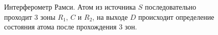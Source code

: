 \begin{figure}
\centering



\caption{Интерферометр Рамси. Атом из источника $S$ последовательно
  проходит 3 зоны $R_1$, $C$ и $R_2$, на выходе $D$ происходит
  определение состояния атома после прохождения 3 зон.}
\label{figPart1RamsiInterferometer}
\end{figure}
